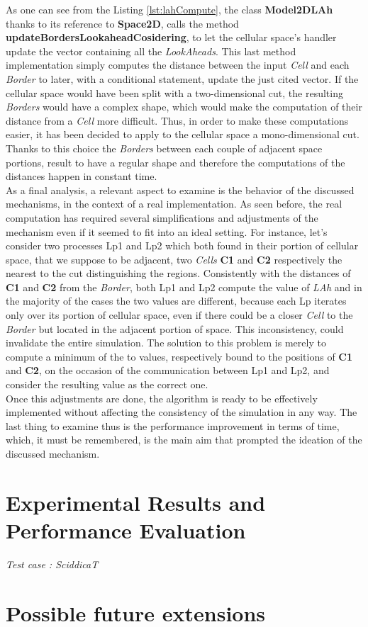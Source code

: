 \documentclass[12pt,a4paper,fleqn]{report}
\begin{document}
As one can see from the Listing \ref{lst:lahCompute}, the class \textbf{Model2DLAh} thanks to its reference to \textbf{Space2D}, calls the method \textbf{updateBordersLookaheadCosidering}, to let the cellular space's handler update the vector containing all the \textit{LookAheads}. This last method  implementation simply computes the distance between the input \textit{Cell} and each \textit{Border} to later, with a conditional statement, update the just cited vector. If the cellular space would have been split with a two-dimensional cut, the resulting \textit{Borders} would have a complex shape, which would make the computation of their distance from a \textit{Cell} more difficult. Thus, in order to make these computations easier, it has been decided to apply to the cellular space a mono-dimensional cut. Thanks to this choice the \textit{Borders} between each couple of adjacent space portions, result to have a regular shape and therefore the computations of the distances happen in constant time. \\
As a final analysis, a relevant aspect to examine is the behavior of the discussed mechanisms, in the context of a real implementation. As seen before, the real computation has required several simplifications and adjustments of the mechanism even if it seemed to fit into an ideal setting. For instance, let's consider two processes Lp1 and Lp2 which both found in their portion of cellular space, that we suppose to be adjacent, two \textit{Cells} \textbf{C1} and \textbf{C2} respectively the nearest to the cut distinguishing the regions. Consistently with the distances of \textbf{C1} and \textbf{C2} from the \textit{Border}, both Lp1 and Lp2 compute the value of \textit{LAh} and in the majority of the cases the two values are different, because each Lp iterates only over its portion of cellular space, even if there could be a closer \textit{Cell} to the \textit{Border} but located in the adjacent portion of space. This inconsistency, could invalidate the entire simulation. The solution to this problem is merely to compute a minimum of the to values, respectively bound to the positions of \textbf{C1} and \textbf{C2}, on the occasion of the communication between Lp1 and Lp2, and consider the resulting value as the correct one. \\
Once this adjustments are done, the algorithm is ready to be effectively implemented without affecting the consistency of the simulation in any way. The last thing to examine thus is the performance improvement in terms of time, which, it must be remembered, is the main aim that prompted the ideation of the discussed mechanism.
\newpage
\chapter{Experimental Results and Performance Evaluation}{\Large{\textit{Test case : SciddicaT}}}\\

\newpage
\chapter{Possible future extensions}

\nocite{0}
\nocite{1}
\printbibliography{}
\end{document}
